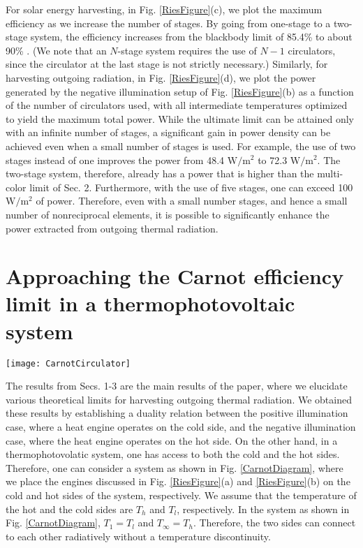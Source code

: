 \documentclass[notitlepage,onecolumn,aps,showpacs,preprintnumbers,amsmath,amssymb,superscriptaddress]{revtex4-1}
\begin{document}
For solar energy harvesting, in Fig. \ref{RiesFigure}(c), we plot the maximum efficiency as we increase the number of stages. By going from one-stage to a two-stage system, the efficiency increases from the blackbody limit of 85.4\% to about 90\% \citep{greenbook, brownas}. (We note that an $N$-stage system requires the use of $N-1$ circulators, since the circulator at the last stage is not strictly necessary.) Similarly, for harvesting outgoing radiation, in Fig. \ref{RiesFigure}(d), we plot the power generated by the negative illumination setup of Fig. \ref{RiesFigure}(b) as a function of the number of circulators used, with all intermediate temperatures optimized to yield the maximum total power. While the ultimate limit can be attained only with an infinite number of stages, a significant gain in power density can be achieved even when a small number of stages is used. For example, the use of two stages instead of one improves the power from 48.4 $\mathrm{W/m^2}$ to 72.3 $\mathrm{W/m^2}$. The two-stage system, therefore, already has a power that is higher than the multi-color limit of Sec. 2. Furthermore, with the use of five stages, one can exceed 100 $\mathrm{W/m^2}$ of power. Therefore, even with a small number stages, and hence a small number of nonreciprocal elements, it is possible to significantly enhance the power extracted from outgoing thermal radiation. \\


\section{Approaching the Carnot efficiency limit in a thermophotovoltaic system}
\begin{figure*}
\centering
\texttt{[image: CarnotCirculator]}
\caption{Schematic for an engine operating at Carnot efficiency in a thermophotovoltaic system. The setup is obtained by combining the constructions of Fig. \ref{RiesFigure}. The temperatures of the intermediate blackbodies increase from $T_1=T_l$ to $T_{\infty}=T_h$.}
\label{CarnotDiagram}
\end{figure*}
The results from Secs. 1-3 are the main results of the paper, where we elucidate various theoretical limits for harvesting outgoing thermal radiation. We obtained these results by establishing a duality relation between the positive illumination case, where a heat engine operates on the cold side, and the negative illumination case, where the heat engine operates on the hot side. On the other hand, in a thermophotovolatic system, one has access to both the cold and the hot sides. Therefore, one can consider a system as shown in Fig. \ref{CarnotDiagram}, where we place the engines discussed in Fig. \ref{RiesFigure}(a) and \ref{RiesFigure}(b) on the cold and hot sides of the system, respectively. We assume that the temperature of the hot and the cold sides are $T_h$ and $T_l$, respectively. In the system as shown in Fig. \ref{CarnotDiagram}, $T_1 = T_l$ and $T_\infty = T_h$. Therefore, the two sides can connect to each other radiatively without a temperature discontinuity. \\
\end{document}
